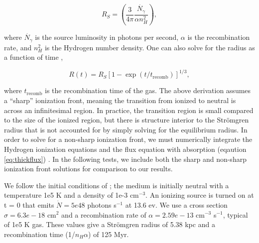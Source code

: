 %

\begin{equation}
\label{eq:strmogrenradius}
R_S = \left( \frac{3}{4\pi} \frac{\dot{N_{\gamma}}}{\alpha n_H^2}\right),
\end{equation}

\noindent
where $\dot{N_{\gamma}}$ is the source luminosity in photons per second, $\alpha$ is the recombination rate, and $n_H^2$ is the Hydrogen number density. One can also solve for the radius as a function of time \citep{spitzer78},

\begin{equation}
\label{eq:stromgrentime}
R(t) = R_S[1-\exp{(t/t_{\mbox{recomb}})}]^{1/3},
\end{equation}

\noindent
where $t_{\mbox{recomb}}$ is the recombination time of the gas. The above derivation assumes a ``sharp'' ionization front, meaning the transition from ionized to neutral is across an infinitesimal region. In practice, the transition region is small compared to the size of the ionized region, but there is structure interior to the Str\"omgren radius that is not accounted for by simply solving for the equilibrium radius. In order to solve for a non-sharp ionization front, we must numerically integrate the Hydrogen ionization equations and the flux equation with absorption (eqaution \ref{eq:thickflux}) \citep{osterbrockFerland2006}. In the following tests, we include both the sharp and non-sharp ionization front solutions for comparison to our results.

We follow the initial conditions of \citet{ilievEt06}; the medium is initially neutral with a temperature 1e5 K and a density of 1e-3 cm$^{-3}$. An ionizing source is turned on at t = 0 that emits $\dot{N} = 5e48$ photons s$^{-1}$ at 13.6 ev. We use a cross section $\sigma = 6.3e-18$ cm$^2$ and a recombination rate of $\alpha = 2.59e-13$ cm$^{-3}$ s$^{-1}$, typical of 1e5 K gas. These values give a Str\"omgren radius of 5.38 kpc and a recombination time (1/$n_H \alpha$) of 125 Myr.

